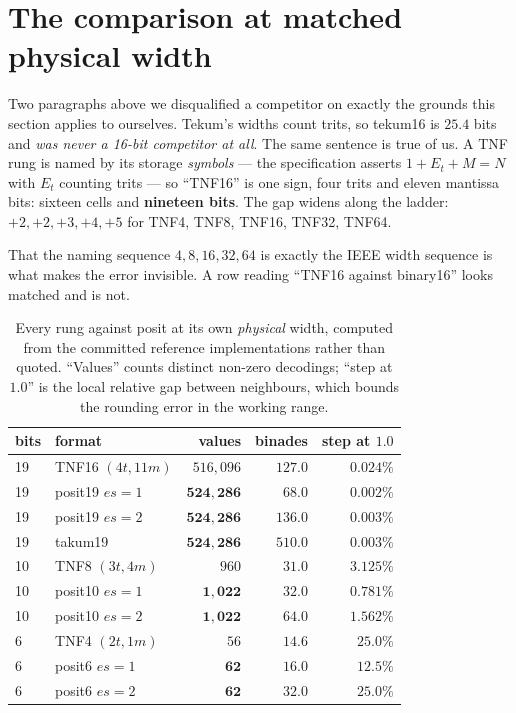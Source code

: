 \documentclass[11pt]{article}
\theoremstyle{definition}
\begin{document}
\section{The comparison at matched physical width}\label{sec:matchedwidth}

Two paragraphs above we disqualified a competitor on exactly the grounds this
section applies to ourselves. Tekum's widths count trits, so tekum16 is
$25.4$ bits and \emph{was never a 16-bit competitor at all}. The same sentence
is true of us. A TNF rung is named by its storage \emph{symbols} --- the
specification asserts $1 + E_t + M = N$ with $E_t$ counting trits --- so
``TNF16'' is one sign, four trits and eleven mantissa bits: sixteen cells and
\textbf{nineteen bits}. The gap widens along the ladder: $+2, +2, +3, +4, +5$
for TNF4, TNF8, TNF16, TNF32, TNF64.

That the naming sequence $4, 8, 16, 32, 64$ is exactly the IEEE width sequence
is what makes the error invisible. A row reading ``TNF16 against binary16''
looks matched and is not.

\begin{table}[t]\centering
\caption{Every rung against posit at its own \emph{physical} width, computed
from the committed reference implementations rather than quoted. ``Values'' counts
distinct non-zero decodings; ``step at $1.0$'' is the local relative gap between
neighbours, which bounds the rounding error in the working range.}
\label{tab:matchedwidth}
\begin{tabular}{llrrr}
\toprule
bits & format & values & binades & step at $1.0$ \\
\midrule
19 & TNF16 $(4t,11m)$ & $516{,}096$          & $127.0$ & $0.024\%$ \\
19 & posit19 $es{=}1$ & $\mathbf{524{,}286}$ & $68.0$  & $\mathbf{0.002\%}$ \\
19 & posit19 $es{=}2$ & $\mathbf{524{,}286}$ & $\mathbf{136.0}$ & $\mathbf{0.003\%}$ \\
19 & takum19          & $\mathbf{524{,}286}$ & $\mathbf{510.0}$ & $\mathbf{0.003\%}$ \\
\midrule
10 & TNF8 $(3t,4m)$   & $960$              & $31.0$ & $3.125\%$ \\
10 & posit10 $es{=}1$ & $\mathbf{1{,}022}$ & $32.0$ & $\mathbf{0.781\%}$ \\
10 & posit10 $es{=}2$ & $\mathbf{1{,}022}$ & $\mathbf{64.0}$ & $\mathbf{1.562\%}$ \\
\midrule
6  & TNF4 $(2t,1m)$   & $56$          & $14.6$ & $25.0\%$ \\
6  & posit6 $es{=}1$  & $\mathbf{62}$ & $16.0$ & $\mathbf{12.5\%}$ \\
6  & posit6 $es{=}2$  & $\mathbf{62}$ & $\mathbf{32.0}$ & $25.0\%$ \\
\bottomrule
\end{tabular}
\end{table}
\end{document}
